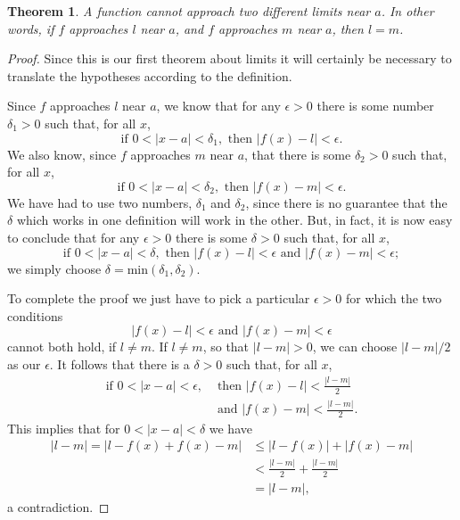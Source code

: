 \documentclass{article}
\newtheorem{theorem}{Theorem}
\begin{document}
\begin{theorem}
  A function cannot approach two different limits near $a$. In other words, if
  $f$ approaches $l$ near $a$, and $f$ approaches $m$ near $a$, then $l = m$.
\end{theorem}
\begin{proof}
  Since this is our first theorem about limits it will certainly be necessary
  to translate the hypotheses according to the definition.

  Since $f$ approaches $l$ near $a$, we know that for any $\epsilon > 0$ there
  is some number $\delta_1 > 0$ such that, for all $x$, \begin{equation*}
    \text{if } 0 < |x - a| < \delta_1, \text{ then } |f(x) - l| < \epsilon.
  \end{equation*} 
  We also know, since $f$ approaches $m$ near $a$, that there is some $\delta_2
  > 0$ such that, for all $x$, \begin{equation*}
    \text{if } 0 < |x - a| < \delta_2, \text{ then } |f(x) - m| < \epsilon.
  \end{equation*}
  We have had to use two numbers, $\delta_1$ and $\delta_2$, since there is no
  guarantee that the $\delta$ which works in one definition will work in the
  other. But, in fact, it is now easy to conclude that for any $\epsilon > 0$
  there is some $\delta > 0$ such that, for all $x$, \begin{equation*}
    \text{if } 0 < |x - a| < \delta, \text{ then } |f(x) - l| < \epsilon
      \text{ and } |f(x) - m| < \epsilon;
  \end{equation*} we simply choose $\delta = \mathrm{min}(\delta_1, \delta_2)$.

  To complete the proof we just have to pick a particular $\epsilon > 0$ for
  which the two conditions \begin{equation*}
    |f(x) - l| < \epsilon\text{ and }|f(x) - m| < \epsilon
  \end{equation*} cannot both hold, if $l \neq m$. If $l \neq m$, so that $|l -
  m| > 0$, we can choose $|l - m|/2$ as our $\epsilon$. It follows that there
  is a $\delta > 0$ such that, for all $x$, \begin{align*}
    \text{if } 0 < |x - a| < \epsilon,
      &\text{ then } |f(x) - l| < \frac{|l - m|}{2} \\
      &\text{ and } |f(x) - m| < \frac{|l - m|}{2}.
  \end{align*}
  This implies that for $0 < |x - a| < \delta$ we have \begin{align*}
    |l - m| = |l - f(x) + f(x) - m| &\leq |l - f(x)| + |f(x) - m| \\
      &< \frac{|l - m|}{2} + \frac{|l - m|}{2} \\
      &= |l - m|,
  \end{align*} a contradiction.
\end{proof}
\end{document}
